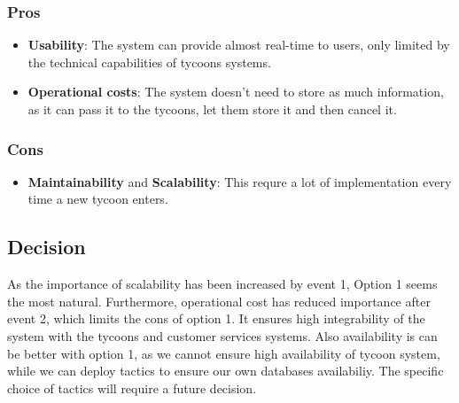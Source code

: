 \subsubsection*{Pros}
\begin{itemize}[noitemsep]
    \item \textbf{Usability}: The system can provide almost real-time to users, only limited by the technical capabilities of tycoons systems.
    \item \textbf{Operational costs}: The system doesn't need to store as much information, as it can pass it to the tycoons, let them store it and then cancel it.
\end{itemize}
\subsubsection*{Cons}
\begin{itemize}[noitemsep]
    \item \textbf{Maintainability} and \textbf{Scalability}: This requre a lot of implementation every time a new tycoon enters.
\end{itemize}

\subsection*{Decision}
As the importance of scalability has been increased by event 1, Option 1 seems the most natural.
Furthermore, operational cost has reduced importance after event 2, which limits the cons of option 1.
It ensures high integrability of the system with the tycoons and customer services systems.
Also availability is can be better with option 1, as we cannot ensure high availability of tycoon system, while we can deploy tactics to ensure our own databases availabiliy. The specific choice of tactics will require a future decision.


